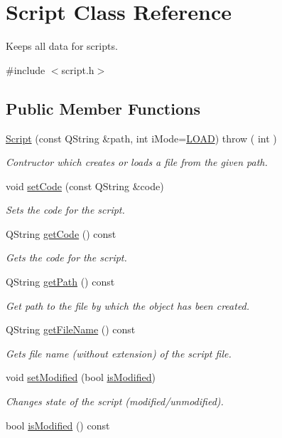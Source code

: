 \hypertarget{class_script}{\section{Script Class Reference}
\label{class_script}
}


Keeps all data for scripts.  




{\ttfamily \#include $<$script.\-h$>$}

\subsection*{Public Member Functions}
\begin{DoxyCompactItemize}
\item 
\hyperlink{class_script_a31bdf4c9dad24a34f89391b65d27ec42}{Script} (const Q\-String \&path, int i\-Mode=\hyperlink{class_script_a95987e80ff92f659bf2366e6b4a42bb1}{L\-O\-A\-D})  throw ( int )
\begin{DoxyCompactList}\small\item\em Contructor which creates or loads a file from the given path. \end{DoxyCompactList}\item 
void \hyperlink{class_script_ae36120acfbb13522b04b19b8893a75c0}{set\-Code} (const Q\-String \&code)
\begin{DoxyCompactList}\small\item\em Sets the code for the script. \end{DoxyCompactList}\item 
Q\-String \hyperlink{class_script_a829824466cc29a1fc019a630a0a64a58}{get\-Code} () const 
\begin{DoxyCompactList}\small\item\em Gets the code for the script. \end{DoxyCompactList}\item 
Q\-String \hyperlink{class_script_a79b3d1c188f66790d4647ce352f978ab}{get\-Path} () const 
\begin{DoxyCompactList}\small\item\em Get path to the file by which the object has been created. \end{DoxyCompactList}\item 
Q\-String \hyperlink{class_script_a4fe7b18819eeebb1ed154f6350ba7fef}{get\-File\-Name} () const 
\begin{DoxyCompactList}\small\item\em Gets file name (without extension) of the script file. \end{DoxyCompactList}\item 
void \hyperlink{class_script_a6d238ee550711d495c720598be7d9f21}{set\-Modified} (bool \hyperlink{class_script_a4affbe0aa40b4b64ed99a8f5a488aa0f}{is\-Modified})
\begin{DoxyCompactList}\small\item\em Changes state of the script (modified/unmodified). \end{DoxyCompactList}\item 
bool \hyperlink{class_script_a4affbe0aa40b4b64ed99a8f5a488aa0f}{is\-Modified} () const 
\end{DoxyCompactItemize}
